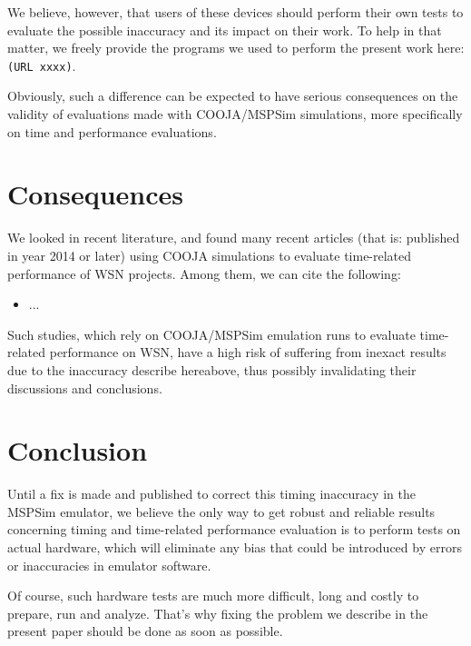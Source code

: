 \documentclass[a4paper,10pt]{article}
\begin{document}
We believe, however, that users of these devices should perform their
own tests to evaluate the possible inaccuracy and its impact on their work.
To help in that matter, we freely provide the programs we used to perform the
present work here:\\
\texttt{(URL xxxx)}.

Obviously, such a difference can be expected to have serious consequences
on the validity of evaluations made with COOJA/MSPSim simulations,
more specifically on time and performance evaluations.


\section{Consequences}

We looked in recent literature, and found many recent articles (that is:
published in year 2014 or later) using COOJA simulations to evaluate
time-related performance of WSN projects. Among them, we can cite
the following:
\begin{itemize}
\item ...
\end{itemize}

Such studies, which rely on COOJA/MSPSim emulation runs to evaluate
time-related performance on WSN, have a high risk of suffering from
inexact results due to the inaccuracy describe hereabove, thus
possibly invalidating their discussions and conclusions.



\section{Conclusion}

Until a fix is made and published to correct this timing inaccuracy
in the MSPSim emulator, we believe the only way to get robust and reliable
results concerning timing and time-related performance evaluation is
to perform tests on actual hardware, which will eliminate any bias
that could be introduced by errors or inaccuracies in emulator software.

Of course, such hardware tests are much more difficult, long and
costly to prepare, run and analyze. That's why fixing the problem
we describe in the present paper should be done as soon as possible.
\end{document}
